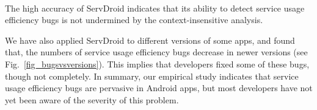 \documentclass[conference]{IEEEtran}
\begin{document}
\medskip
{\setlength{\parindent}{0 em}
}\\
\medskip

The high accuracy of \textsf{ServDroid} indicates that its ability to detect
service usage efficiency bugs is not undermined by the context-insensitive
analysis.

We have also applied \textsf{ServDroid} to different versions of some apps, and
found that, the numbers of service usage efficiency bugs decrease in newer
versions (see Fig.~\ref{fig_bugsvsversions}). This implies that developers
fixed some of these bugs, though not completely. In summary, our empirical study
indicates that service usage efficiency bugs are pervasive in Android apps, but
most developers have not yet been aware of the severity of this problem.
\end{document}
